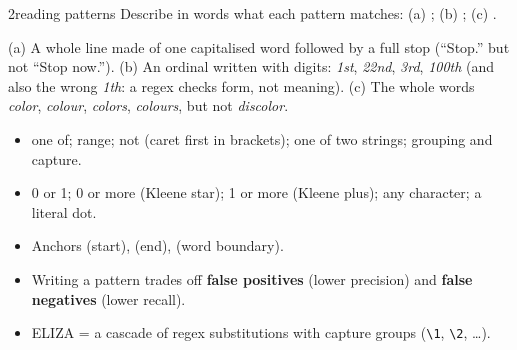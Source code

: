 \begin{nbexercise}{2}{reading patterns}
Describe in words what each pattern matches: (a) ;
(b) ; (c) .
\end{nbexercise}
\begin{nbsolution}
(a) A whole line made of one capitalised word followed by a full stop (``Stop.'' but not
``Stop now.''). (b) An ordinal written with digits: \emph{1st}, \emph{22nd},
\emph{3rd}, \emph{100th} (and also the wrong \emph{1th}: a regex checks form, not
meaning). (c) The whole words \emph{color}, \emph{colour}, \emph{colors},
\emph{colours}, but not \emph{discolor}.
\end{nbsolution}

\begin{nbsummary}
\begin{itemize}[nosep]
  \item \re{[abc]} one of; \re{[a-z]} range; \re{[\textasciicircum a]} not (caret first
        in brackets);  one of two strings; \re{(\,)} grouping and capture.
  \item {} 0 or 1; \re{*} 0 or more (Kleene star); \re{+} 1 or more (Kleene plus);
         any character;  a literal dot.
  \item Anchors \re{\textasciicircum} (start), \re{\$} (end),  (word
        boundary).
  \item Writing a pattern trades off \textbf{false positives} (lower precision) and
        \textbf{false negatives} (lower recall).
  \item ELIZA = a cascade of regex substitutions with capture groups
        (\texttt{\textbackslash 1}, \texttt{\textbackslash 2}, \ldots).
\end{itemize}
\end{nbsummary}
